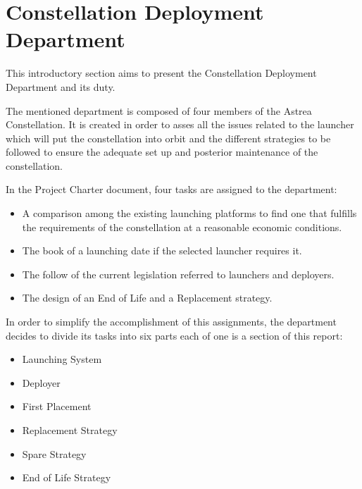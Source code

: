 \section{Constellation Deployment Department}
This introductory section aims to present the Constellation Deployment Department and its duty. 

The mentioned department is composed of four members of the Astrea Constellation. It is created in order to asses all the issues related to the launcher which will put the constellation into orbit and the different strategies to be followed to ensure the adequate set up and posterior maintenance of the constellation. 

In the Project Charter document, four tasks are assigned to the department:

\begin{itemize}
\item A comparison among the existing launching platforms to find one that fulfills the requirements of the constellation at a reasonable economic conditions. 
\item The book of a launching date if the selected launcher requires it.
\item The follow of the current legislation referred to launchers and deployers.
\item The design of an End of Life and a Replacement strategy.
\end{itemize}

In order to simplify the accomplishment of this assignments, the department decides to divide its tasks into six parts each of one is a section of this report:

\begin{itemize}
\item Launching System
\item Deployer
\item First Placement
\item Replacement Strategy
\item Spare Strategy
\item End of Life Strategy
\end{itemize}